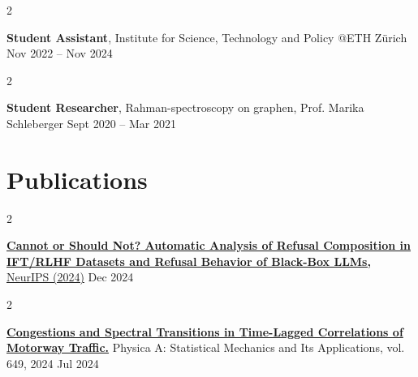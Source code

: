 \documentclass[10pt, letterpaper]{article}
\newenvironment{twocolentry}[2][]{
    \onecolentry
    \def\secondColumn{#2}
    \setcolumnwidth{\fill, 4.5 cm}
    \begin{paracol}{2}
}{
    \switchcolumn \raggedleft \secondColumn
    \end{paracol}
    \endonecolentry
} %
\begin{document}
        \vspace{0.2 cm}

        \begin{twocolentry}{
            Nov 2022 – Nov 2024
        }
            \textbf{Student Assistant}, Institute for Science, Technology and Policy @ETH Zürich\end{twocolentry}


        

        \vspace{0.2 cm}

        \begin{twocolentry}{
            Sept 2020 – Mar 2021
        }
            \textbf{Student Researcher}, Rahman-spectroscopy on graphen, Prof. Marika Schleberger \end{twocolentry}

   
        \vspace{0.2 cm}

      

\section{Publications}

        \begin{twocolentry}{
            Dec 2024
        }
        \href{https://arxiv.org/abs/2412.16974}{\textbf{Cannot or Should Not? Automatic Analysis of Refusal Composition in IFT/RLHF Datasets and Refusal Behavior of Black-Box LLMs,}} \href{https://neurips.cc/virtual/2024/105596}{NeurIPS  (2024)}\end{twocolentry}

     \vspace{0.2 cm}


        \begin{twocolentry}{
            Jul 2024 
        }
            \href{https://www.sciencedirect.com/science/article/pii/S0378437124004618?via%3Dihub}{\textbf{Congestions and Spectral Transitions in Time-Lagged Correlations of Motorway Traffic.}} Physica A: Statistical Mechanics and Its Applications, vol. 649, 2024\end{twocolentry}

        \vspace{0.2 cm}
        

\end{document}
